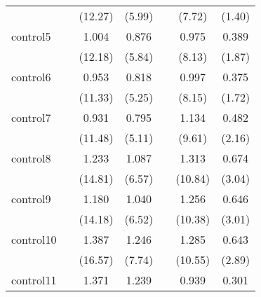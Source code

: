 {\begin{tabular}{l*{6}{c}}
            &                     &     (12.27)         &      (5.99)         &                     &      (7.72)         &      (1.40)         \\
[1em]
control5    &                     &       1.004\sym{***}&       0.876\sym{***}&                     &       0.975\sym{***}&       0.389         \\
            &                     &     (12.18)         &      (5.84)         &                     &      (8.13)         &      (1.87)         \\
[1em]
control6    &                     &       0.953\sym{***}&       0.818\sym{***}&                     &       0.997\sym{***}&       0.375         \\
            &                     &     (11.33)         &      (5.25)         &                     &      (8.15)         &      (1.72)         \\
[1em]
control7    &                     &       0.931\sym{***}&       0.795\sym{***}&                     &       1.134\sym{***}&       0.482\sym{*}  \\
            &                     &     (11.48)         &      (5.11)         &                     &      (9.61)         &      (2.16)         \\
[1em]
control8    &                     &       1.233\sym{***}&       1.087\sym{***}&                     &       1.313\sym{***}&       0.674\sym{**} \\
            &                     &     (14.81)         &      (6.57)         &                     &     (10.84)         &      (3.04)         \\
[1em]
control9    &                     &       1.180\sym{***}&       1.040\sym{***}&                     &       1.256\sym{***}&       0.646\sym{**} \\
            &                     &     (14.18)         &      (6.52)         &                     &     (10.38)         &      (3.01)         \\
[1em]
control10   &                     &       1.387\sym{***}&       1.246\sym{***}&                     &       1.285\sym{***}&       0.643\sym{**} \\
            &                     &     (16.57)         &      (7.74)         &                     &     (10.55)         &      (2.89)         \\
[1em]
control11   &                     &       1.371\sym{***}&       1.239\sym{***}&                     &       0.939\sym{***}&       0.301         \\

\end{tabular}}
